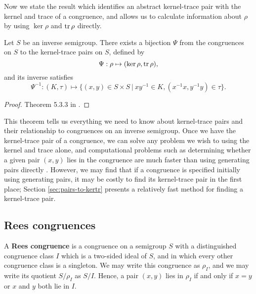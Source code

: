 Now we state the result which identifies an abstract kernel-trace pair with the
kernel and trace of a congruence, and allows us to calculate information about
$\rho$ by using $\ker \rho$ and $\operatorname{tr} \rho$ directly.

\begin{theorem}
  \label{thm:kernel-trace-pair}

  Let $S$ be an inverse semigroup.  There exists a bijection $\Psi$ from the
  congruences on $S$ to the kernel-trace pairs on $S$, defined by
  $$\Psi: \rho \mapsto (\ker\rho, \operatorname{tr}\rho),$$
  and its inverse satisfies
  $$\Psi^{-1} : (K,\tau) \mapsto
  \{(x,y) \in S \times S ~|~ xy^{-1} \in K, (x^{-1}x, y^{-1}y) \in \tau\}.$$
  \begin{proof}
    Theorem 5.3.3 in \cite{howie}.
  \end{proof}
\end{theorem}

This theorem tells us everything we need to know about kernel-trace pairs and
their relationship to congruences on an inverse semigroup.  Once we have the
kernel-trace pair of a congruence, we can solve any problem we wish to using the
kernel and trace alone, and computational problems such as determining whether a
given pair $(x,y)$ lies in the congruence are much faster than using
generating pairs directly \cite[\S 6.1.3]{mtorpey_msc}.  However, we may find
that if a congruence is specified initially using generating pairs, it may be
costly to find its kernel-trace pair in the first place; Section
\ref{sec:pairs-to-kertr} presents a relatively fast method for finding a kernel-trace pair.

\subsection{Rees congruences}
\label{sec:converting-rees}
A \textbf{Rees congruence} is a congruence on a semigroup $S$ with a
distinguished congruence class $I$ which is a two-sided ideal of $S$, and in
which every other congruence class is a singleton.  We may write this congruence
as $\rho_I$, and we may write its quotient $S/\rho_I$ as $S/I$.  Hence, a pair
$(x,y)$ lies in $\rho_I$ if and only if $x=y$ or $x$ and $y$ both lie in $I$.

